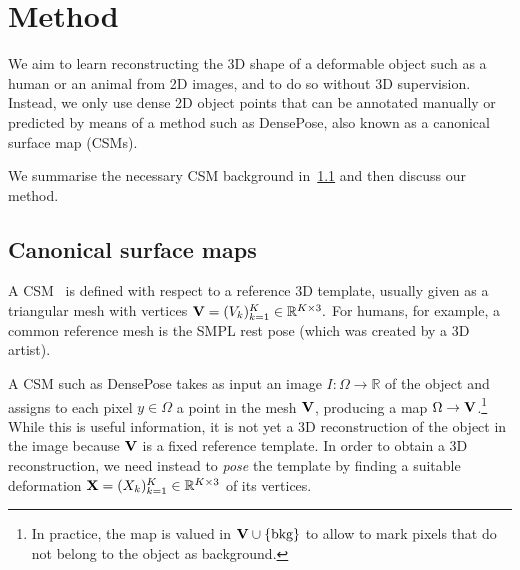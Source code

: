 \section{Method}\label{s:method}

We aim to learn reconstructing the 3D shape of a deformable object such as a human or an animal from 2D images, and to do so without 3D supervision.
Instead, we only use dense 2D object points that can be annotated manually or predicted by means of a method such as DensePose, also known as a canonical surface map (CSMs).

We summarise the necessary CSM background in~\cref{s:csm} and then discuss our method.


\subsection{Canonical surface maps}\label{s:csm}

A CSM~\cite{thewlis17dense,guler18densepose:,Neverova2019,neverova2020continuous,kulkarni19canonical,sanakoyeu2020transferring,Kulkarni2020} is defined with respect to a reference 3D template, usually given as a triangular mesh with vertices
$
\mathbf{V} = (V_k)_{k = 1}^{K} \in \mathbb{R}^{K\times 3}.
$
For humans, for example, a common reference mesh is the SMPL rest pose (which was created by a 3D artist).

A CSM such as DensePose takes as input an image $I : \Omega \rightarrow \mathbb{R}$ of the object and assigns to each pixel $y \in \Omega$ a point in the mesh $\mathbf{V}$, producing a map $\Omega \rightarrow \mathbf{V}$.\footnote{In practice, the map is valued in $\mathbf{V} \cup \{\text{bkg}\}$ to allow to mark pixels that do not belong to the object as background.}
%
While this is useful information, it is not yet a 3D reconstruction of the object in the image because $\mathbf{V}$ is a fixed reference template.
In order to obtain a 3D reconstruction, we need instead to \emph{pose} the template by finding a suitable deformation
$
 \mathbf{X} = (X_k)_{k=1}^K \in \mathbb{R}^{K\times 3}
$
of its vertices.

